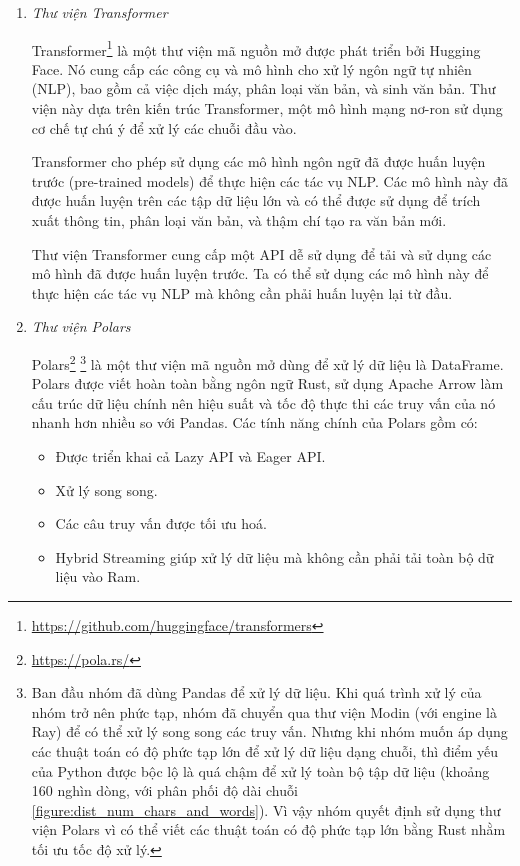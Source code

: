\begin{enumerate}
    \item \textit{Thư viện Transformer}

          Transformer\footnote{\url{https://github.com/huggingface/transformers}} là một thư viện mã nguồn mở được phát triển bởi Hugging Face. Nó cung cấp các công cụ và mô hình cho xử lý ngôn ngữ tự nhiên (NLP), bao gồm cả việc dịch máy, phân loại văn bản, và sinh văn bản. Thư viện này dựa trên kiến trúc Transformer, một mô hình mạng nơ-ron sử dụng cơ chế tự chú ý để xử lý các chuỗi đầu vào.

          Transformer cho phép sử dụng các mô hình ngôn ngữ đã được huấn luyện trước (pre-trained models) để thực hiện các tác vụ NLP. Các mô hình này đã được huấn luyện trên các tập dữ liệu lớn và có thể được sử dụng để trích xuất thông tin, phân loại văn bản, và thậm chí tạo ra văn bản mới.

          Thư viện Transformer cung cấp một API dễ sử dụng để tải và sử dụng các mô hình đã được huấn luyện trước. Ta có thể sử dụng các mô hình này để thực hiện các tác vụ NLP mà không cần phải huấn luyện lại từ đầu.

    \item \textit{Thư viện Polars}

          Polars\footnote{\url{https://pola.rs/}} \footnote{Ban đầu nhóm đã dùng Pandas để xử lý dữ liệu. Khi quá trình xử lý của nhóm trở nên phức tạp, nhóm đã chuyển qua thư viện Modin (với engine là Ray) để có thể xử lý song song các truy vấn. Nhưng khi nhóm muốn áp dụng các thuật toán có độ phức tạp lớn để xử lý dữ liệu dạng chuỗi, thì điểm yếu của Python được bộc lộ là quá chậm để xử lý toàn bộ tập dữ liệu (khoảng 160 nghìn dòng, với phân phối độ dài chuỗi \ref{figure:dist_num_chars_and_words}). Vì vậy nhóm quyết định sử dụng thư viện Polars vì có thể viết các thuật toán có độ phức tạp lớn bằng Rust nhằm tối ưu tốc độ xử lý.} là một thư viện mã nguồn mở dùng để xử lý dữ liệu là DataFrame. Polars được viết hoàn toàn bằng ngôn ngữ Rust, sử dụng Apache Arrow làm cấu trúc dữ liệu chính nên hiệu suất và tốc độ thực thi các truy vấn của nó nhanh hơn nhiều so với Pandas. Các tính năng chính của Polars gồm có:
          \begin{itemize}
              \item Được triển khai cả Lazy API và Eager API.
              \item Xử lý song song.
              \item Các câu truy vấn được tối ưu hoá.
              \item Hybrid Streaming giúp xử lý dữ liệu mà không cần phải tải toàn bộ dữ liệu vào Ram.
          \end{itemize}


\end{enumerate}
